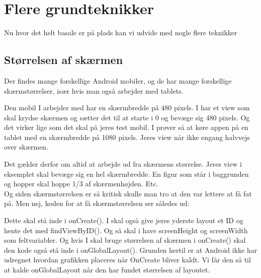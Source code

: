 \section{Flere grundteknikker}
Nu hvor det helt basale er på plads kan vi udvide med nogle flere teknikker
\subsection{Størrelsen af skærmen}
Der findes mange forskellige Android mobiler, og de har mange forskellige skærmstørrelser, især hvis man også arbejder med tablets. 
\begin{example}
	Den mobil I arbejder med har en skærmbredde på 480 pixels. I har et view som skal krydse skærmen og sætter det til at starte i 0 og bevæge sig 480 pixels. Og det virker lige som det skal på jeres test mobil. I prøver så at køre appen på en tablet med en skærmbredde på 1080 pixels. Jeres view når ikke engang halvvejs over skærmen. 
\end{example}
Det gælder derfor om altid at arbejde ud fra skærmens størrelse. Jeres view i eksemplet skal bevæge sig en hel skærmbredde. En figur som står i baggrunden og hopper skal hoppe 1/3 af skærmenhøjden. Etc.\\

Og siden skærmstørrelsen er så kritisk skulle man tro at den var lettere at få fat på. Men nej, koden for at få skærmstørrelsen ser således ud:
%			

Dette skal stå inde i onCreate(). I skal også give jeres yderste layout et ID og hente det med findViewByID(). Og så skal i have screenHeight og screenWidth som feltvariabler. Og hvis I skal bruge størrelsen af skærmen i onCreate() skal den kode også stå inde i onGlobalLayout().
Grunden hertil er at Android ikke har udregnet hvordan grafikken placeres når OnCreate bliver kaldt. Vi får den så til at kalde onGlobalLayout når den har fundet størrelsen af layoutet.
